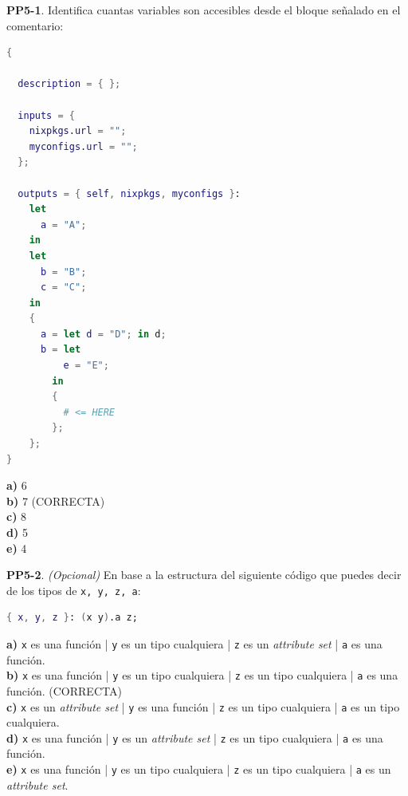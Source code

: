 \textbf{PP5-1}. Identifica cuantas variables son accesibles desde el bloque señalado en el comentario:

\begin{bloquecodigo}
\begin{lstlisting}[language=nix]
{

  description = { };

  inputs = {
    nixpkgs.url = "";
    myconfigs.url = "";
  };

  outputs = { self, nixpkgs, myconfigs }:
    let
      a = "A";
    in
    let
      b = "B";
      c = "C";
    in
    {
      a = let d = "D"; in d;
      b = let
          e = "E";
        in
        {
          # <= HERE
        };
    };
}
\end{lstlisting}
\end{bloquecodigo}

\textbf{a)} 6\\
\textbf{b)} 7 (CORRECTA)\\
\textbf{c)} 8\\
\textbf{d)} 5\\
\textbf{e)} 4

\textbf{PP5-2}. \emph{(Opcional)} En base a la estructura del siguiente código que puedes decir de los tipos de \texttt{x, y, z, a}:

\begin{bloquecodigo}
\begin{lstlisting}[language=nix]
{ x, y, z }: (x y).a z;
\end{lstlisting}
\end{bloquecodigo}

\textbf{a)} \texttt{x} es una función | \texttt{y} es un tipo cualquiera | \texttt{z} es un \emph{attribute set} | \texttt{a} es una función.\\
\textbf{b)} \texttt{x} es una función | \texttt{y} es un tipo cualquiera | \texttt{z} es un tipo cualquiera | \texttt{a} es una función. (CORRECTA)\\
\textbf{c)} \texttt{x} es un \emph{attribute set} | \texttt{y} es una función | \texttt{z} es un tipo cualquiera | \texttt{a} es un tipo cualquiera.\\
\textbf{d)} \texttt{x} es una función | \texttt{y} es un \emph{attribute set} | \texttt{z} es un tipo cualquiera | \texttt{a} es una función.\\
\textbf{e)} \texttt{x} es una función | \texttt{y} es un tipo cualquiera | \texttt{z} es un tipo cualquiera | \texttt{a} es un \emph{attribute set}.

